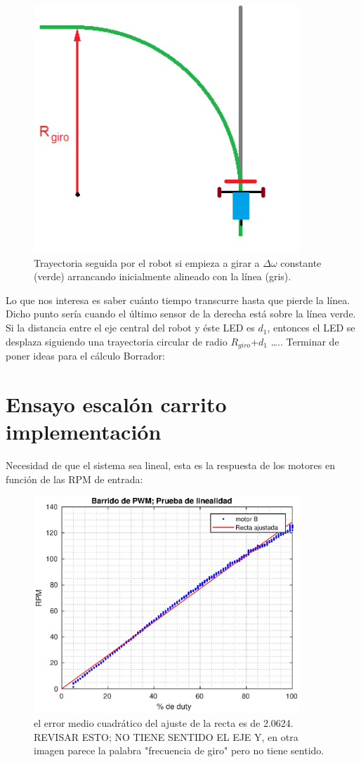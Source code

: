 \documentclass[10pt,conference,a4paper,onecolumn]{article}%
\begin{document}
\begin{figure}[h]
\centering
\includegraphics[width=10cm]{./imagenes/carrito_Ensayo_escalon.png}
\caption{Trayectoria seguida por el robot si empieza a girar a $\Delta \omega $ constante (verde) arrancando inicialmente alineado con la línea (gris).}
\label{fig:carritoEsc}
\end{figure}
Lo que nos interesa es saber cuánto tiempo transcurre hasta que pierde la línea. Dicho punto sería cuando el último sensor de la derecha está sobre la línea verde. Si la distancia entre el eje central del robot y éste LED es $d_1$, entonces el LED se desplaza siguiendo una trayectoria circular de radio $R_{giro}$+$d_1$ …..
Terminar de poner ideas para el cálculo
Borrador:


\section{Ensayo escalón carrito implementación}

Necesidad de que el sistema sea lineal, esta es la respuesta de los motores en función de las RPM de entrada:

\begin{figure}[h]
\centering
\includegraphics[width=10cm]{./imagenes/prueba_linealidad}
\caption{el error medio cuadrático del ajuste de la recta es de 2.0624. REVISAR ESTO; NO TIENE SENTIDO EL EJE Y, en otra imagen parece la palabra "frecuencia de giro" pero no tiene sentido.}
\label{fig:prueba_linealidad}
\end{figure}
\end{document}
